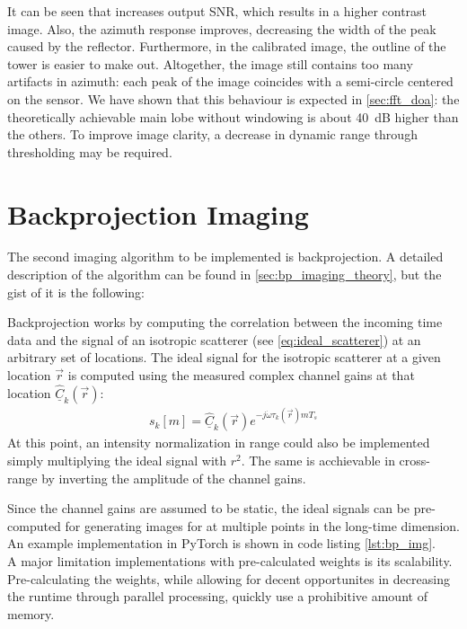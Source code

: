 It can be seen that increases output SNR, which results in a higher contrast image.
Also, the azimuth response improves, decreasing the width of the peak caused by the reflector.
Furthermore, in the calibrated image, the outline of the tower is easier to make out.
Altogether, the image still contains too many artifacts in azimuth:
each peak of the image coincides with a semi-circle centered on the sensor.
We have shown that this behaviour is expected in \cref{sec:fft_doa}:
the theoretically achievable main lobe without windowing is about \SI{40}{\dB} higher than the others.
To improve image clarity, a decrease in dynamic range through thresholding may be required.

\section{Backprojection Imaging}

The second imaging algorithm to be implemented is backprojection.
A detailed description of the algorithm can be found in \cref{sec:bp_imaging_theory},
but the gist of it is the following:

Backprojection works by computing the correlation between the incoming time data
and the signal of an isotropic scatterer (see \cref{eq:ideal_scatterer})
at an arbitrary set of locations.
The ideal signal for the isotropic scatterer at a given location $\vec r$
is computed using the measured complex channel gains at that location $\underline{\hat C}_k(\vec r)$:
\begin{align*}
    s_k[m] = \underline{\hat C}_k(\vec r) e^{-j\dot\omega\tau_k(\vec r)mT_s}
\end{align*}
At this point, an intensity normalization in range
could also be implemented simply multiplying the ideal signal with $r^2$.
The same is acchievable in cross-range by inverting the amplitude of the channel gains.

Since the channel gains are assumed to be static,
the ideal signals can be pre-computed for generating images for at multiple points in the long-time dimension.
An example implementation in PyTorch is shown in code listing \ref{lst:bp_img}.
\\

A major limitation implementations with pre-calculated weights is its scalability.
Pre-calculating the weights, while allowing for decent opportunites in decreasing the runtime through parallel processing,
quickly use a prohibitive amount of memory.

